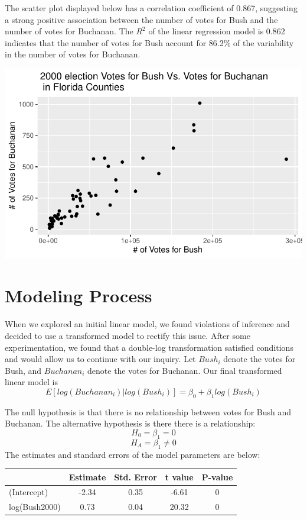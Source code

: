 \documentclass[
  letterpaper,
  DIV=11,
  numbers=noendperiod]{scrartcl}
\begin{document}
The scatter plot displayed below has a correlation coefficient of 0.867,
suggesting a strong positive association between the number of votes for
Bush and the number of votes for Buchanan. The \(R^2\) of the linear
regression model is 0.862 indicates that the number of votes for Bush
account for 86.2\% of the variability in the number of votes for
Buchanan.

\includegraphics{case-study-template_files/figure-pdf/unnamed-chunk-4-1.pdf}

\section{Modeling Process}\label{modeling-process}

When we explored an initial linear model, we found violations of
inference and decided to use a transformed model to rectify this issue.
After some experimentation, we found that a double-log transformation
satisfied conditions and would allow us to continue with our inquiry.
Let \(Bush_i\) denote the votes for Bush, and \(Buchanan_i\) denote the
votes for Buchanan. Our final transformed linear model is
\[E[log(Buchanan_i)|log(Bush_i)] = \beta_0 + \beta_1log(Bush_i)\]

The null hypothesis is that there is no relationship between votes for
Bush and Buchanan. The alternative hypothesis is there there is a
relationship: \[H_0 = \beta_1 = 0\] \[H_A = \beta_1 \neq 0\] The
estimates and standard errors of the model parameters are below:

\begin{table}[H]
\centering
\begin{tabular}[t]{lcccc}
\toprule
  & Estimate & Std. Error & t value & P-value\\
\midrule
(Intercept) & -2.34 & 0.35 & -6.61 & 0\\
log(Bush2000) & 0.73 & 0.04 & 20.32 & 0\\
\bottomrule
\end{tabular}
\end{table}
\end{document}
